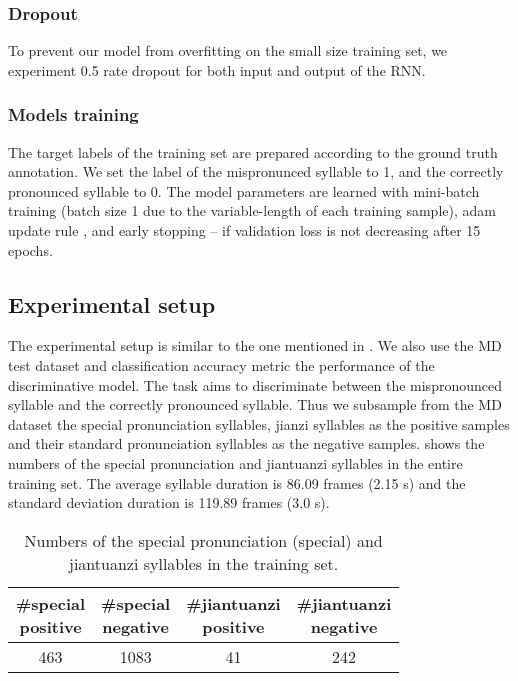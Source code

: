 \subsubsection{Dropout}

To prevent our model from overfitting on the small size training set, we experiment 0.5 rate dropout for both input and output of the RNN.

\subsubsection{Models training}

The target labels of the training set are prepared according to the ground truth annotation. We set the label of the mispronunced syllable to 1, and the correctly pronounced syllable to 0. The model parameters are learned with mini-batch training (batch size 1 due to the variable-length of each training sample), adam update rule \cite{kingma2014adam}, and early stopping -- if validation loss is not decreasing after 15 epochs. 

\subsection{Experimental setup}\label{sec:ch6:experimental_setup}

The experimental setup is similar to the one mentioned in . We also use the MD test dataset and classification accuracy metric the performance of the discriminative model. The task aims to discriminate between the mispronounced syllable and the correctly pronounced syllable. Thus we subsample from the MD dataset the special pronunciation syllables, jianzi syllables as the positive samples and their standard pronunciation syllables as the negative samples.  shows the numbers of the special pronunciation and jiantuanzi syllables in the entire training set. The average syllable duration is 86.09 frames (2.15 s) and the standard deviation duration is 119.89 frames (3.0 s). 

\begin{table}[ht!]
\centering
\caption{Numbers of the special pronunciation (special) and jiantuanzi syllables in the training set.}
\label{tab:ch6:num_syllables_training_set}
\begin{tabular}{cccc}
\toprule
\makecell{\#special\\positive} & \makecell{\#special\\negative} & \makecell{\#jiantuanzi\\positive} & \makecell{\#jiantuanzi\\negative} \\
\midrule
463 & 1083 & 41 & 242 \\
\bottomrule
\end{tabular}
\end{table}

